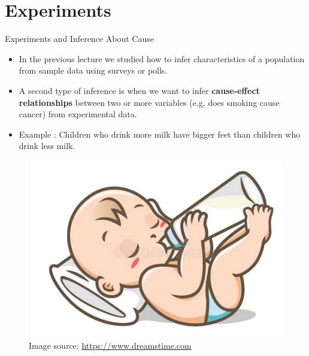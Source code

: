 \documentclass[handout]{beamer}
\begin{document}
\section{Experiments}

\begin{frame}{Experiments and Inference About Cause}
\scriptsize{
\begin{itemize}
 \item In the previous lecture we studied how to infer characteristics of a population from sample data using surveys or polls.
 \item A second type of inference is when we want to infer \textbf{cause-effect relationships} between two or more variables (e.g, does smoking cause cancer) from experimental data. 
 \item Example \cite{watkins2010statistics}: Children who drink more milk have bigger feet than children who drink less milk. 
 
 
\end{itemize}


\begin{figure}[h!]
	\centering
	\includegraphics[scale=0.25]{pics/milk.png}
	\caption{Image source: \url{https://www.dreamstime.com}}
\end{figure}



} 
\end{frame}
\end{document}
